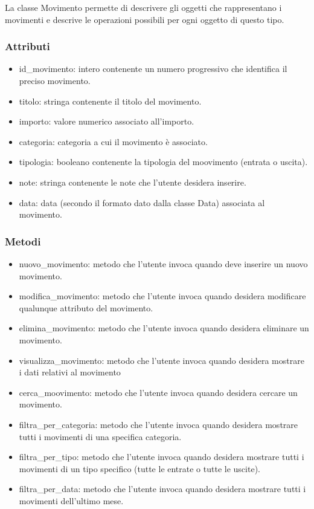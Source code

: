 \documentclass[a4paper,12pt]{article}
\begin{document}
La classe {\sffamily Movimento} permette di descrivere gli oggetti che rappresentano i movimenti e descrive le operazioni possibili per ogni oggetto di questo tipo.
\subsubsection*{Attributi}
\begin{itemize} \setlength\itemsep{0.01em}
\item {\ttfamily id\_movimento}: intero contenente un numero progressivo che identifica il preciso movimento.
\item {\ttfamily titolo}: stringa contenente il titolo del movimento.
\item {\ttfamily importo}: valore numerico associato all'importo.
\item {\ttfamily categoria}:  categoria a cui il movimento è associato.
\item {\ttfamily tipologia}: booleano contenente la tipologia del moovimento (entrata o uscita).
\item {\ttfamily note}: stringa contenente le note che l'utente desidera inserire.
\item {\ttfamily data}: data (secondo il formato dato dalla classe {\sffamily Data}) associata al movimento.
\end{itemize}
\subsubsection*{Metodi}
\begin{itemize} \setlength\itemsep{0.01em}
\item {\ttfamily nuovo\_movimento}: metodo che l'utente invoca quando deve inserire un nuovo movimento. 
\item {\ttfamily modifica\_movimento}: metodo che l'utente invoca quando desidera modificare qualunque attributo del movimento.
\item {\ttfamily elimina\_movimento}: metodo che l'utente invoca quando desidera eliminare un movimento. 
\item {\ttfamily visualizza\_movimento}: metodo che l'utente invoca quando desidera mostrare i dati relativi al movimento
\item {\ttfamily cerca\_moovimento}: metodo che l'utente invoca quando desidera cercare un movimento. 
\item {\ttfamily filtra\_per\_categoria}: metodo che l'utente invoca quando desidera mostrare tutti i movimenti di una specifica categoria. 
\item {\ttfamily filtra\_per\_tipo}: metodo che l'utente invoca quando desidera mostrare tutti i movimenti di un tipo specifico (tutte le entrate o tutte le uscite). 
\item {\ttfamily filtra\_per\_data}: metodo che l'utente invoca quando desidera mostrare tutti i movimenti dell'ultimo mese. 
\end{itemize}
\end{document}
